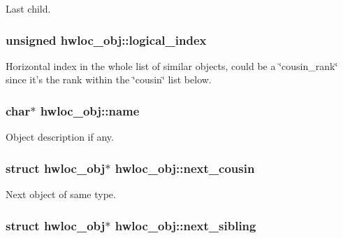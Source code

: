 Last child. \hypertarget{structhwloc__obj_a0d07fb7b8935e137c94d75a3eb492ae9}{
\subsubsection[{logical\_\-index}]{\setlength{\rightskip}{0pt plus 5cm}unsigned {\bf hwloc\_\-obj::logical\_\-index}}}
\label{structhwloc__obj_a0d07fb7b8935e137c94d75a3eb492ae9}


Horizontal index in the whole list of similar objects, could be a \char`\"{}cousin\_\-rank\char`\"{} since it's the rank within the \char`\"{}cousin\char`\"{} list below. \hypertarget{structhwloc__obj_abb709ec38f2970677e4e57d1d30be96d}{
\subsubsection[{name}]{\setlength{\rightskip}{0pt plus 5cm}char$\ast$ {\bf hwloc\_\-obj::name}}}
\label{structhwloc__obj_abb709ec38f2970677e4e57d1d30be96d}


Object description if any. \hypertarget{structhwloc__obj_a85a788017457129589318b6c39451acf}{
\subsubsection[{next\_\-cousin}]{\setlength{\rightskip}{0pt plus 5cm}struct {\bf hwloc\_\-obj}$\ast$ {\bf hwloc\_\-obj::next\_\-cousin}}}
\label{structhwloc__obj_a85a788017457129589318b6c39451acf}


Next object of same type. \hypertarget{structhwloc__obj_a7f2343ed476fe4942e6fffd4cade1b40}{
\subsubsection[{next\_\-sibling}]{\setlength{\rightskip}{0pt plus 5cm}struct {\bf hwloc\_\-obj}$\ast$ {\bf hwloc\_\-obj::next\_\-sibling}}}
\label{structhwloc__obj_a7f2343ed476fe4942e6fffd4cade1b40}


